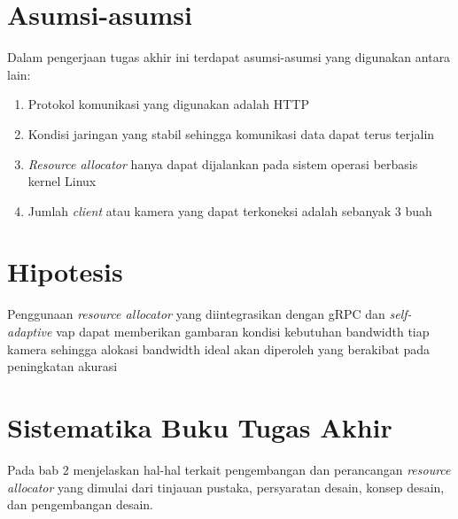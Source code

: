 \section{Asumsi-asumsi}

Dalam pengerjaan tugas akhir ini terdapat asumsi-asumsi yang digunakan antara lain:

\begin{enumerate}
	\item Protokol komunikasi yang digunakan adalah HTTP
	\item Kondisi jaringan yang stabil sehingga komunikasi data dapat terus terjalin
	\item \textit{Resource allocator} hanya dapat dijalankan pada sistem operasi berbasis kernel Linux
	\item Jumlah \textit{client} atau kamera yang dapat terkoneksi adalah sebanyak 3 buah
\end{enumerate}

\section{Hipotesis}



Penggunaan \textit{resource allocator} yang diintegrasikan dengan gRPC dan \textit{self-adaptive} \gls{vap} dapat memberikan gambaran kondisi kebutuhan bandwidth
tiap kamera sehingga alokasi bandwidth ideal akan diperoleh yang berakibat pada peningkatan akurasi

\section{Sistematika Buku Tugas Akhir}

Pada bab 2 menjelaskan hal-hal terkait pengembangan dan perancangan \textit{resource allocator} yang dimulai dari tinjauan pustaka, persyaratan desain, konsep desain, dan pengembangan desain.

